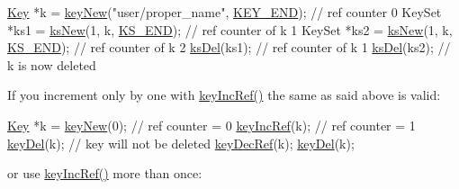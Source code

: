 \begin{DoxyCodeInclude}
\hyperlink{classkdb_1_1Key_a5679f5cae63caddd64a60388b9cc77fa}{Key} *k = \hyperlink{group__key_gad23c65b44bf48d773759e1f9a4d43b89}{keyNew}(\textcolor{stringliteral}{"user/proper\_name"}, \hyperlink{group__key_gga91fb3178848bd682000958089abbaf40aa8adb6fcb92dec58fb19410eacfdd403}{KEY\_END}); \textcolor{comment}{// ref counter 0}
KeySet *ks1 = \hyperlink{group__keyset_ga671e1aaee3ae9dc13b4834a4ddbd2c3c}{ksNew}(1, k, \hyperlink{kdbenum_8c_a7a28fce3773b2c873c94ac80b8b4cd54}{KS\_END}); \textcolor{comment}{// ref counter of k 1}
KeySet *ks2 = \hyperlink{group__keyset_ga671e1aaee3ae9dc13b4834a4ddbd2c3c}{ksNew}(1, k, \hyperlink{kdbenum_8c_a7a28fce3773b2c873c94ac80b8b4cd54}{KS\_END}); \textcolor{comment}{// ref counter of k 2}
\hyperlink{group__keyset_ga27e5c16473b02a422238c8d970db7ac8}{ksDel}(ks1); \textcolor{comment}{// ref counter of k 1}
\hyperlink{group__keyset_ga27e5c16473b02a422238c8d970db7ac8}{ksDel}(ks2); \textcolor{comment}{// k is now deleted}
\end{DoxyCodeInclude}
 If you increment only by one with \hyperlink{group__key_ga6970a6f254d67af7e39f8e469bb162f1}{key\+Inc\+Ref()} the same as said above is valid\+:


\begin{DoxyCodeInclude}
\hyperlink{classkdb_1_1Key_a5679f5cae63caddd64a60388b9cc77fa}{Key} *k = \hyperlink{group__key_gad23c65b44bf48d773759e1f9a4d43b89}{keyNew}(0); \textcolor{comment}{// ref counter = 0}
\hyperlink{group__key_ga6970a6f254d67af7e39f8e469bb162f1}{keyIncRef}(k); \textcolor{comment}{// ref counter = 1}
\hyperlink{group__key_ga3df95bbc2494e3e6703ece5639be5bb1}{keyDel}(k); \textcolor{comment}{// key will not be deleted}
\hyperlink{group__key_ga2c6433ca22109e4e141946057eccb283}{keyDecRef}(k);
\hyperlink{group__key_ga3df95bbc2494e3e6703ece5639be5bb1}{keyDel}(k);
\end{DoxyCodeInclude}
 or use \hyperlink{group__key_ga6970a6f254d67af7e39f8e469bb162f1}{key\+Inc\+Ref()} more than once\+:


